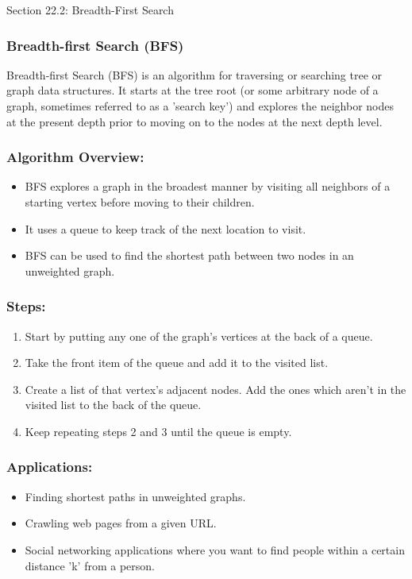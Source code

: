 \begin{notes}{Section 22.2: Breadth-First Search}
    \subsubsection*{Breadth-first Search (BFS)}

    Breadth-first Search (BFS) is an algorithm for traversing or searching tree or graph data structures. It starts at the tree root (or some arbitrary node of a graph, sometimes referred to as a 
    'search key') and explores the neighbor nodes at the present depth prior to moving on to the nodes at the next depth level. \vspace*{1em}
    
    \subsubsection*{Algorithm Overview:}
    \begin{itemize}
        \item BFS explores a graph in the broadest manner by visiting all neighbors of a starting vertex before moving to their children.
        \item It uses a queue to keep track of the next location to visit.
        \item BFS can be used to find the shortest path between two nodes in an unweighted graph.
    \end{itemize}
    
    \subsubsection*{Steps:}
    \begin{enumerate}
        \item Start by putting any one of the graph's vertices at the back of a queue.
        \item Take the front item of the queue and add it to the visited list.
        \item Create a list of that vertex's adjacent nodes. Add the ones which aren't in the visited list to the back of the queue.
        \item Keep repeating steps 2 and 3 until the queue is empty.
    \end{enumerate}
    
    \subsubsection*{Applications:}
    \begin{itemize}
        \item Finding shortest paths in unweighted graphs.
        \item Crawling web pages from a given URL.
        \item Social networking applications where you want to find people within a certain distance 'k' from a person.
    \end{itemize}
    

\end{notes}
